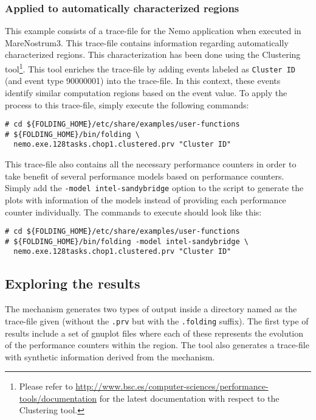\subsubsection{Applied to automatically characterized regions}\label{subsubsec:ClusteredExample}

This example consists of a trace-file for the Nemo application when executed in MareNostrum3.
This trace-file contains information regarding automatically characterized regions.
This characterization has been done using the Clustering tool\footnote{Please refer to \url{http://www.bsc.es/computer-sciences/performance-tools/documentation} for the latest documentation with respect to the Clustering tool.}.
This tool enriches the trace-file by adding events labeled as \texttt{Cluster ID} (and event type 90000001) into the trace-file.
In this context, these events identify similar computation regions based on the event value.
To apply the \FOLDING process to this trace-file, simply execute the following commands:

\begin{verbatim}
# cd ${FOLDING_HOME}/etc/share/examples/user-functions
# ${FOLDING_HOME}/bin/folding \
  nemo.exe.128tasks.chop1.clustered.prv "Cluster ID"
\end{verbatim}

This trace-file also contains all the necessary performance counters in order to take benefit of several performance models based on performance counters.
Simply add the \texttt{-model intel-sandybridge} option to the \FOLDING script to generate the plots with information of the models instead of providing each performance counter individually.
The commands to execute should look like this:

\begin{verbatim}
# cd ${FOLDING_HOME}/etc/share/examples/user-functions
# ${FOLDING_HOME}/bin/folding -model intel-sandybridge \
  nemo.exe.128tasks.chop1.clustered.prv "Cluster ID"
\end{verbatim}

\subsection{Exploring the results}

The \FOLDING mechanism generates two types of output inside a directory named as the trace-file given (without the \texttt{.prv} but with the \texttt{.folding} suffix).
The first type of results include a set of gnuplot files where each of these represents the evolution of the performance counters within the region.
The tool also generates a \PARAVER trace-file with synthetic information derived from the \FOLDING mechanism.

